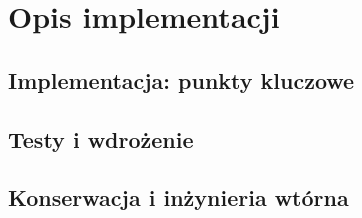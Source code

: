 \chapter{Opis implementacji}
\section{Implementacja: punkty kluczowe}
\section{Testy i wdrożenie}
\section{Konserwacja i inżynieria wtórna}